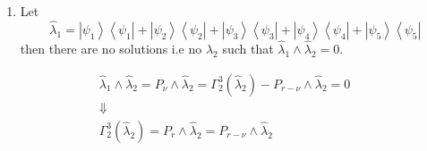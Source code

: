 \documentclass[aps,preprint]{revtex4}%
\begin{document}
\begin{enumerate}
\item Let
\begin{equation}
\hat{\lambda}_{1}=\left\vert \psi_{1}\right\rangle \left\langle \psi
_{1}\right\vert +\left\vert \psi_{2}\right\rangle \left\langle \psi
_{2}\right\vert +\left\vert \psi_{3}\right\rangle \left\langle \psi
_{3}\right\vert +\left\vert \psi_{4}\right\rangle \left\langle \psi
_{4}\right\vert +\left\vert \psi_{5}\right\rangle \left\langle \psi
_{5}\right\vert
\end{equation}
then there are no solutions i.e no $\hat{\lambda}_{2}$ such that $\hat
{\lambda}_{1}\wedge\hat{\lambda}_{2}=0.$
\end{enumerate}

\bigskip%

\begin{gather}
\hat{\lambda}_{1}\wedge\hat{\lambda}_{2}=P_{\nu}\wedge\hat{\lambda}_{2}%
=\Gamma_{2}^{3}\left(  \hat{\lambda}_{2}\right)  -P_{r-\nu}\wedge\hat{\lambda
}_{2}=0\\
\Downarrow\\
\Gamma_{2}^{3}\left(  \hat{\lambda}_{2}\right)  =P_{r}\wedge\hat{\lambda}%
_{2}=P_{r-\nu}\wedge\hat{\lambda}_{2}%
\end{gather}


\bigskip%
\end{document}
